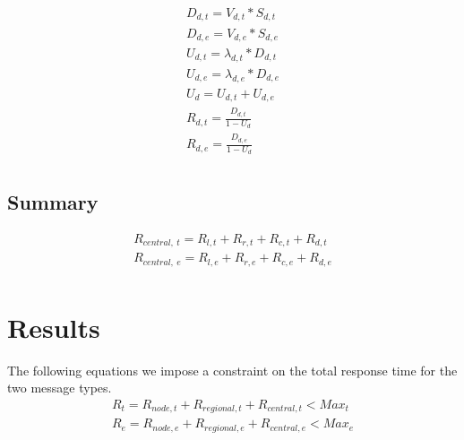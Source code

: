 \documentclass[11pt]{article}
\begin{document}
\begin{equation}
    \begin{array}{l}
        D_{d, t} = V_{d, t} * S_{d, t} \\ %
        D_{d, e} = V_{d, e} * S_{d, e} \\
        U_{d, t} = \lambda_{d, t} * D_{d, t} \\
        U_{d, e} = \lambda_{d, e} * D_{d, e} \\
        U_{d} = U_{d, t} + U_{d, e} \\
        R_{d, t} = \frac{D_{d, t}}{1 - U_{d}} \\
        R_{d, e} = \frac{D_{d, e}}{1 - U_{d}} \\
    \end{array}
\end{equation}


\subsection{Summary}
\begin{equation}
    \begin{array}{l}
        R_{central, \ t} = R_{l, t} + R_{r, t} + R_{c, t} + R_{d, t} \\
        R_{central, \ e} = R_{l, e} + R_{r, e} + R_{c, e} + R_{d, e} \\
    \end{array}
\end{equation}


\section{Results}
The following equations we impose a constraint on the total response time for the two message types.
\begin{equation}
    \begin{array}{l}
        R_{t} = R_{node, t} + R_{regional, t} + R_{central, t} < Max_t \\
        R_{e} = R_{node, e} + R_{regional, e} + R_{central, e} < Max_e \\
    \end{array}
\end{equation}
\end{document}
